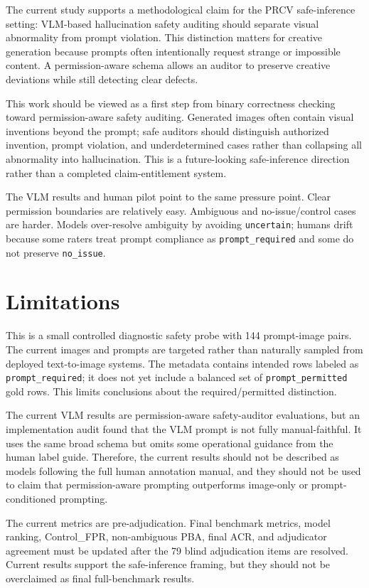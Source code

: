 \documentclass[11pt]{article}
\begin{document}
The current study supports a methodological claim for the PRCV safe-inference setting: VLM-based hallucination safety auditing should separate visual abnormality from prompt violation. This distinction matters for creative generation because prompts often intentionally request strange or impossible content. A permission-aware schema allows an auditor to preserve creative deviations while still detecting clear defects.

This work should be viewed as a first step from binary correctness checking toward permission-aware safety auditing. Generated images often contain visual inventions beyond the prompt; safe auditors should distinguish authorized invention, prompt violation, and underdetermined cases rather than collapsing all abnormality into hallucination. This is a future-looking safe-inference direction rather than a completed claim-entitlement system.

The VLM results and human pilot point to the same pressure point. Clear permission boundaries are relatively easy. Ambiguous and no-issue/control cases are harder. Models over-resolve ambiguity by avoiding \texttt{uncertain}; humans drift because some raters treat prompt compliance as \texttt{prompt\_required} and some do not preserve \texttt{no\_issue}.

\section{Limitations}

This is a small controlled diagnostic safety probe with 144 prompt-image pairs. The current images and prompts are targeted rather than naturally sampled from deployed text-to-image systems. The metadata contains intended rows labeled as \texttt{prompt\_required}; it does not yet include a balanced set of \texttt{prompt\_permitted} gold rows. This limits conclusions about the required/permitted distinction.

The current VLM results are permission-aware safety-auditor evaluations, but an implementation audit found that the VLM prompt is not fully manual-faithful. It uses the same broad schema but omits some operational guidance from the human label guide. Therefore, the current results should not be described as models following the full human annotation manual, and they should not be used to claim that permission-aware prompting outperforms image-only or prompt-conditioned prompting.

The current metrics are pre-adjudication. Final benchmark metrics, model ranking, Control\_FPR, non-ambiguous PBA, final ACR, and adjudicator agreement must be updated after the 79 blind adjudication items are resolved. Current results support the safe-inference framing, but they should not be overclaimed as final full-benchmark results.
\end{document}
